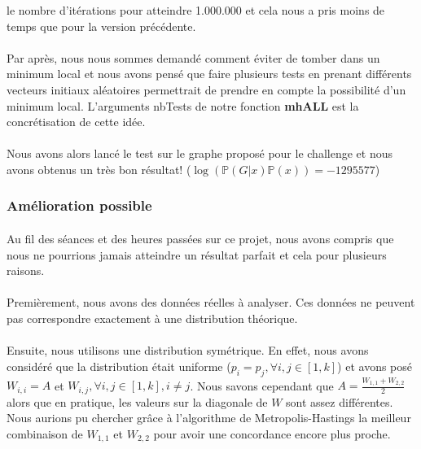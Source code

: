 le nombre d'itérations pour atteindre 1.000.000 et cela nous a pris moins de temps que pour la version précédente.
\\\\
Par après, nous nous sommes demandé comment 
éviter de tomber dans un minimum local et nous avons pensé que faire plusieurs tests en prenant 
différents vecteurs initiaux aléatoires permettrait de prendre en compte la possibilité d'un minimum local.
L'arguments nbTests de notre fonction \textbf{mhALL} est la concrétisation de cette idée.
\\\\
Nous avons alors lancé le test sur le graphe proposé pour le challenge et nous avons obtenus un très 
bon résultat! ($\log(\mathbb{P}(G|x)\mathbb{P}(x)) = -1295577$)
\subsubsection*{Amélioration possible}
\paragraph*{}
Au fil des séances et des heures passées sur ce projet, nous avons compris que nous ne pourrions jamais 
atteindre un résultat parfait et cela pour plusieurs raisons. 
\\\\
Premièrement, nous avons des données réelles à analyser. Ces données ne peuvent pas correspondre exactement
à une distribution théorique. 
\\\\
Ensuite, nous utilisons une distribution symétrique. En effet, nous avons considéré que la distribution
était uniforme ($p_i = p_j ,\forall i,j \in[1,k]$) et avons posé $W_{i,i}=A$ et $W_{i,j},\forall i,j \in [1,k] ,i \ne j$.
Nous savons cependant que $A = \frac{W_{1,1}+W_{2,2}}{2}$ alors que en pratique, les valeurs sur la diagonale de $W$
sont assez différentes. Nous aurions pu chercher grâce à l'algorithme de Metropolis-Hastings la meilleur combinaison de 
$W_{1,1}$ et $W_{2,2}$ pour avoir une concordance encore plus proche. 